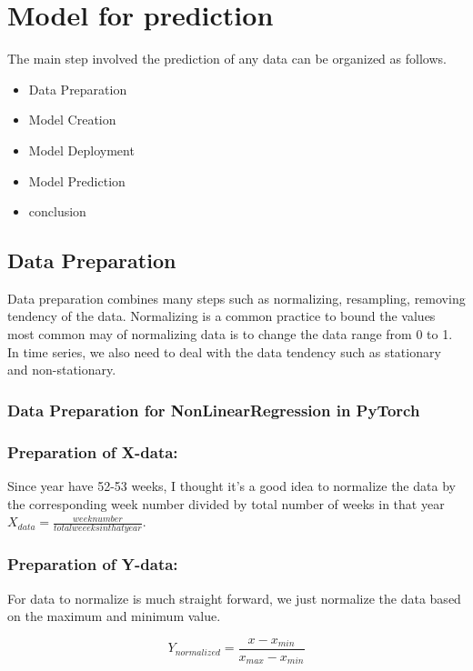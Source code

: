 \section{Model for prediction}
The main step involved the prediction of any data can be organized as follows.
\begin{itemize}
    \item Data Preparation
    \item Model Creation
    \item Model Deployment
    \item Model Prediction
    \item conclusion
\end{itemize}

\subsection*{Data Preparation}
Data preparation combines many steps such as normalizing, resampling, removing tendency of the data. Normalizing is a common practice to bound the values most common may of normalizing data is to change the data range from 0 to 1. In time series, we also need to deal with the data tendency such as stationary and non-stationary. \par
\subsubsection*{Data Preparation for NonLinearRegression in PyTorch}\par
\subsubsection*{Preparation of X-data:}\par
Since year have 52-53 weeks,  I thought it's a good idea to normalize the data by the corresponding week number divided by total number of weeks in that year $X_{data} = \frac{week number}{total weeeks in that year}$. 
\subsubsection*{Preparation of Y-data:}\par
For data to normalize is much straight forward, we just normalize the data based on the maximum and minimum value. \par
\begin{equation}
    Y_{normalized} = \frac{x-x_{min}}{x_{max}-x_{min}}
    \label{eq:invarients 2}
\end{equation}
